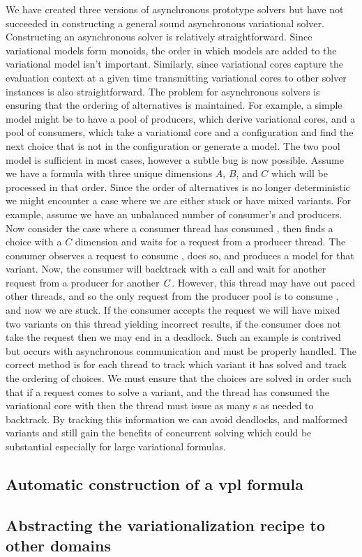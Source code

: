 We have created three versions of asynchronous prototype solvers but have not
succeeded in constructing a general sound asynchronous variational solver.
Constructing an asynchronous solver is relatively straightforward. Since
variational models form monoids, the order in which models are added to the
variational model isn't important. Similarly, since variational cores capture
the evaluation context at a given time transmitting variational cores to other
solver instances is also straightforward. The problem for asynchronous solvers
is ensuring that the ordering of alternatives is maintained. For example, a
simple model might be to have a pool of producers, which derive variational
cores, and a pool of consumers, which take a variational core and a
configuration and find the next choice that is not in the configuration or
generate a model. The two pool model is sufficient in most cases, however a
subtle bug is now possible. Assume we have a formula with three unique
dimensions $A$, $B$, and $C$ which will be processed in that order. Since the
order of alternatives is no longer deterministic we might encounter a case where
we are either stuck or have mixed variants. For example, assume we have an
unbalanced number of consumer's and producers. Now consider the case where a
consumer thread has consumed , then finds a choice
with a $C$ dimension and waits for a request from a producer thread. The
consumer observes a request to consume , does so, and produces a
model for that variant. Now, the consumer will backtrack with a  call
and wait for another request from a producer for another $\mathit{C}$. However, this
thread may have out paced other threads, and so the only request from the
producer pool is to consume , and now we are stuck. If the
consumer accepts the request we will have mixed two variants on this thread
yielding incorrect results, if the consumer does not take the request then we
may end in a deadlock. Such an example is contrived but occurs with asynchronous
communication and must be properly handled. The correct method is for each
thread to track which variant it has solved and track the ordering of choices.
We must ensure that the choices are solved in order such that if a request comes
to solve a  variant, and the thread has consumed the
variational core with  then the thread must issue as many
s as needed to backtrack. By tracking this information we can avoid
deadlocks, and malformed variants and still gain the benefits of concurrent
solving which could be substantial especially for large variational formulas.


\subsection{Automatic construction of a \ac{vpl} formula}

\subsection{Abstracting the variationalization recipe to other domains}


